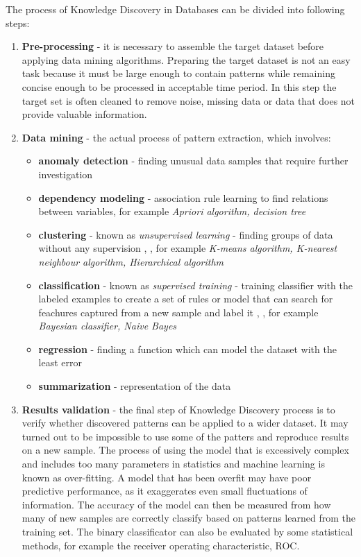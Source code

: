 The process of Knowledge Discovery in Databases can be divided into following steps:

\begin{enumerate}
	\item \textbf{Pre-processing} - it is necessary to assemble the target dataset before applying data mining algorithms. Preparing the target dataset is not an easy task because it must be large enough to contain patterns while remaining concise enough to be processed in acceptable time period. In this step the target set is often cleaned to remove noise, missing data or data that does not provide valuable information.
	\item \textbf{Data mining} - the actual process of pattern extraction, which involves:
		\begin{itemize}
			\item \textbf{anomaly detection} - finding unusual data samples that require further investigation
			\item \textbf{dependency modeling} - association rule learning to find relations between variables, for example \textit{Apriori algorithm, decision tree}
			\item \textbf{clustering} - known as \textit{unsupervised learning} - finding groups of data without any supervision \cite{fe_signal_processing}, , for example \textit{K-means algorithm, K-nearest neighbour algorithm, Hierarchical algorithm}
			\item \textbf{classification} - known as \textit{supervised training} - training classifier with the labeled examples to create a set of rules or model that can search for feachures captured from a new sample and label it \cite{fe_signal_processing}, , for example \textit{Bayesian classifier, Naive Bayes}
			\item \textbf{regression} - finding a function which can model the dataset with the least error
			\item \textbf{summarization} - representation of the data
		\end{itemize}
	\item \textbf{Results validation} - the final step of Knowledge Discovery process is to verify whether discovered patterns can be applied to a wider dataset. It may turned out to be impossible to use some of the patters and reproduce results on a new sample. The process of using the model that is excessively complex and includes too many parameters in statistics and machine learning is known as over-fitting. A model that has been overfit may have poor predictive performance, as it  exaggerates even small fluctuations of information.  The accuracy of the model can then be measured from how many of new samples are correctly classify based on patterns learned from the training set. The binary classificator can also be evaluated by some statistical methods, for example the receiver operating characteristic, ROC.
	
\end{enumerate} 


